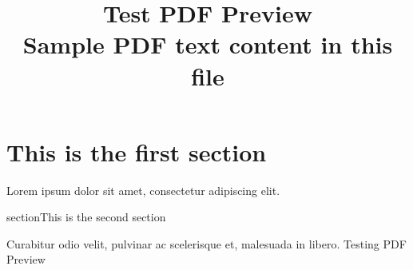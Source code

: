 \documentclass[a4paper]{article}
\begin{document}
\title{\huge Test PDF Preview \\ \large Sample PDF text content in this file}
\maketitle

\large

\section{This is the first section}

Lorem ipsum dolor sit amet, consectetur adipiscing elit.

section{This is the second section}

Curabitur odio velit, pulvinar ac scelerisque et, malesuada in libero.
Testing PDF Preview
\end{document}

